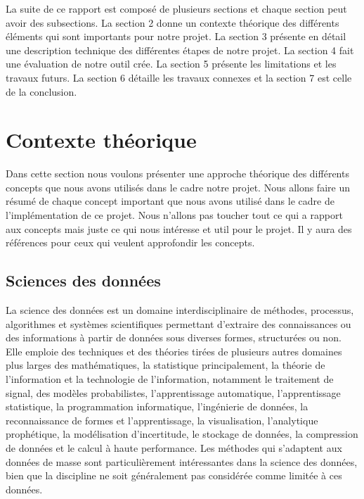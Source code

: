 \documentclass[12pt, french]{article}
\begin{document}
La suite de ce rapport est composé de plusieurs sections et chaque section peut avoir des subsections. La section 2 donne un contexte théorique des différents éléments qui sont importants pour notre projet. La section 3 présente en détail une description technique des différentes étapes de notre projet. La section 4 fait une évaluation de notre outil crée. La section 5 présente les limitations et les travaux futurs. La section 6 détaille les travaux connexes et la section 7 est celle de la conclusion.


\newpage

\section{Contexte théorique}

Dans cette section nous voulons présenter une approche théorique des différents concepts que nous avons utilisés dans le cadre notre projet. Nous allons faire un résumé de chaque concept important que nous avons utilisé dans le cadre de l'implémentation de ce projet. Nous n'allons pas toucher tout ce qui a rapport aux concepts mais juste ce qui nous intéresse et util pour le projet. Il y aura des références pour ceux qui veulent approfondir les concepts. 

\subsection{Sciences des données}

La science des données est un domaine interdisciplinaire de méthodes, processus, algorithmes et systèmes scientifiques permettant d'extraire des connaissances ou des informations à partir de données sous diverses formes, structurées ou non. Elle emploie des techniques et des théories tirées de plusieurs autres domaines plus larges des mathématiques, la statistique principalement, la théorie de l'information et la technologie de l'information, notamment le traitement de signal, des modèles probabilistes, l'apprentissage automatique, l'apprentissage statistique, la programmation informatique, l'ingénierie de données, la reconnaissance de formes et l'apprentissage, la visualisation, l'analytique prophétique, la modélisation d'incertitude, le stockage de données, la compression de données et le calcul à haute performance. Les méthodes qui s'adaptent aux données de masse sont particulièrement intéressantes dans la science des données, bien que la discipline ne soit généralement pas considérée comme limitée à ces données.\\
	
\end{document}
